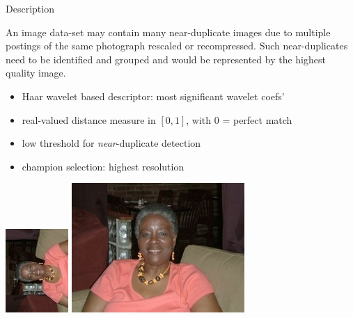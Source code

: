 
\begin{xpsectionbox}{Description}{}

An image data-set may contain many near-duplicate images due to multiple postings of the same photograph rescaled or recompressed. Such near-duplicates need to be identified and grouped and would be represented by the highest quality image.

\begin{minipage}{0.6\linewidth}

{\vspace*{0.2cm}\noindent\hspace*{0.2cm}{\bf\Titlesize Solution}\newline}{\vspace{-0.75cm}}

\begin{itemize}
	\item Haar wavelet based descriptor: most significant wavelet coefs'
	\item real-valued distance measure in $[0,1]$, with 0 = perfect match
	\item low threshold for \emph{near}-duplicate detection
	\item champion selection: highest resolution
\end{itemize}
\end{minipage}
\begin{minipage}{0.5\linewidth}

\begin{center}
			\includegraphics[height=0.25\linewidth]{images/NearDupScaleRot}
			\includegraphics[height=0.25\linewidth]{images/NearDupScale}
\end{center}

\end{minipage}
\end{xpsectionbox}

